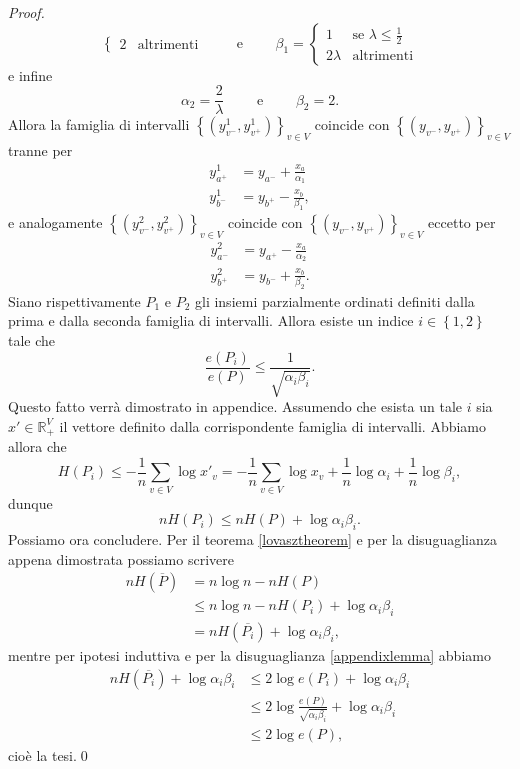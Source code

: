 \begin{proof}
\[\begin{cases}
		2 & \mbox{altrimenti} 
	\end{cases}
	\qquad\mbox{ e }\qquad \beta_1= 
	\begin{cases}
		1 & \mbox{se } \lambda\le\frac{1}{2} \\
		2\lambda & \mbox{altrimenti} 
	\end{cases}
	\]
	e infine
	\[\alpha_2=\frac{2}{\lambda}\qquad\mbox{ e }\qquad\beta_2=2.\]
	Allora la famiglia di intervalli \(\left\{\left(y_{v^-}^1, y_{v^+}^1\right)\right\}_{v\in V}\) coincide con \(\left\{\left(y_{v^-}, y_{v^+}\right)\right\}_{v\in V}\) tranne per 
	\begin{align}
		y_{a^+}^1 &= y_{a^-} + \frac{x_a}{\alpha_1} \nonumber \\
		y_{b^-}^1 &= y_{b^+} - \frac{x_b}{\beta_1}, \nonumber 
	\end{align}
	e analogamente \(\left\{\left(y_{v^-}^2, y_{v^+}^2\right)\right\}_{v\in V}\) coincide con \(\left\{\left(y_{v^-}, y_{v^+}\right)\right\}_{v\in V}\) eccetto per 
	\begin{align}
		y_{a^-}^2 &= y_{a^+} - \frac{x_a}{\alpha_2} \nonumber \\
		y_{b^+}^2 &= y_{b^-} + \frac{x_b}{\beta_2}. \nonumber 
	\end{align}
	Siano rispettivamente \(P_1\) e \(P_2\) gli insiemi parzialmente ordinati definiti dalla prima e dalla seconda famiglia di intervalli. Allora esiste un indice \(i\in\left\{1,2\right\}\) tale che 
	\begin{equation}
		\label{appendixlemma} \frac{e(P_i)}{e(P)}\le\frac{1}{\sqrt{\alpha_i\beta_i}}. 
	\end{equation}
	Questo fatto verrà dimostrato in appendice. Assumendo che esista un tale \(i\) sia \(x'\in\mathbb{R}_{+}^V\) il vettore definito dalla corrispondente famiglia di intervalli. Abbiamo allora che
	\[H(P_i)\le-\frac{1}{n}\sum_{v\in V}{\log{x'_v}=-\frac{1}{n}\sum_{v\in V}{\log{x_v}}+\frac{1}{n}\log{\alpha_i}+\frac{1}{n}\log{\beta_i}},\]
	dunque
	\[nH(P_i)\le nH(P)+\log{\alpha_i\beta_i}.\]
	Possiamo ora concludere. Per il teorema \ref{lovasztheorem} e per la disuguaglianza appena dimostrata possiamo scrivere 
	\begin{align}
		nH(\overline{P}) &= n\log{n}-nH(P) \nonumber \\
		&\le n\log{n}-nH(P_i)+\log{\alpha_i\beta_i} \nonumber \\
		&= nH(\overline{P_i})+\log{\alpha_i\beta_i}, \nonumber 
	\end{align}
	mentre per ipotesi induttiva e per la disuguaglianza \ref{appendixlemma} abbiamo 
	\begin{align}
		nH(\overline{P_i})+\log{\alpha_i\beta_i} &\le 2\log{e(P_i)}+\log{\alpha_i\beta_i} \nonumber \\
		&\le 2\log{\frac{e(P)}{\sqrt{\alpha_i\beta_i}}}+\log{\alpha_i\beta_i} \nonumber \\
		&\le 2\log{e(P)}, \nonumber 
	\end{align}
	cioè la tesi.\qed 
\end{proof}

